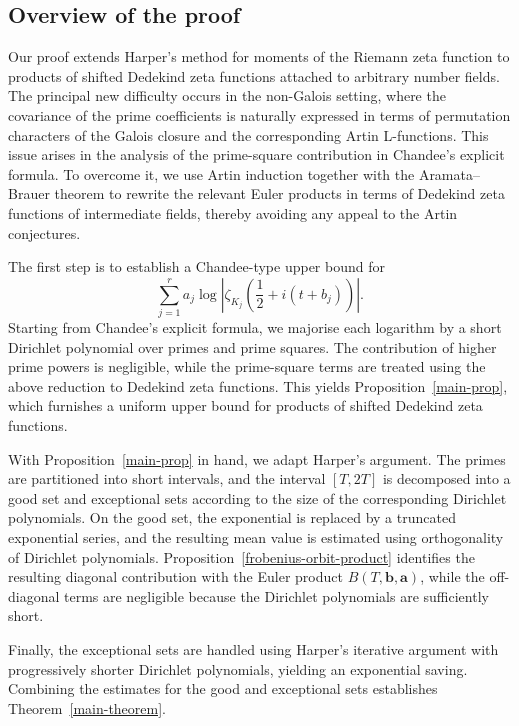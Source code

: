 \documentclass[twoside,reqno,11pt,a4paper]{amsart}
\numberwithin{equation}{section}
\theoremstyle{plain}
\theoremstyle{definition}
\theoremstyle{remark}
\begin{document}
\subsection*{Overview of the proof}
Our proof extends Harper's method for moments of the Riemann zeta function to products of shifted Dedekind zeta functions attached to arbitrary number fields. The principal new difficulty occurs in the non-Galois setting, where the covariance of the prime coefficients is naturally expressed in terms of permutation characters of the Galois closure and the corresponding Artin L-functions. This issue arises in the analysis of the prime-square contribution in Chandee's explicit formula. To overcome it, we use Artin induction together with the Aramata--Brauer theorem to rewrite the relevant Euler products in terms of Dedekind zeta functions of intermediate fields, thereby avoiding any appeal to the Artin conjectures.

The first step is to establish a Chandee-type upper bound for
\begin{equation*}
    \sum_{j=1}^{r}a_j
\log\left|
\zeta_{K_j}\!\left(\frac12+i(t+b_j)\right)
\right|.
\end{equation*}
Starting from Chandee's explicit formula, we majorise each logarithm by a short Dirichlet polynomial over primes and prime squares. The contribution of higher prime powers is negligible, while the prime-square terms are treated using the above reduction to Dedekind zeta functions. This yields Proposition~\ref{main-prop}, which furnishes a uniform upper bound for products of shifted Dedekind zeta functions.

With Proposition~\ref{main-prop} in hand, we adapt Harper's argument. The primes are partitioned into short intervals, and the interval $[T,2T]$ is decomposed into a good set and exceptional sets according to the size of the corresponding Dirichlet polynomials. On the good set, the exponential is replaced by a truncated exponential series, and the resulting mean value is estimated using orthogonality of Dirichlet polynomials. Proposition~\ref{frobenius-orbit-product} identifies the resulting diagonal contribution with the Euler product
$B(T,\mathbf b,\mathbf a)$,
while the off-diagonal terms are negligible because the Dirichlet polynomials are sufficiently short.

Finally, the exceptional sets are handled using Harper's iterative argument with progressively shorter Dirichlet polynomials, yielding an exponential saving. Combining the estimates for the good and exceptional sets establishes Theorem~\ref{main-theorem}. 
\end{document}
